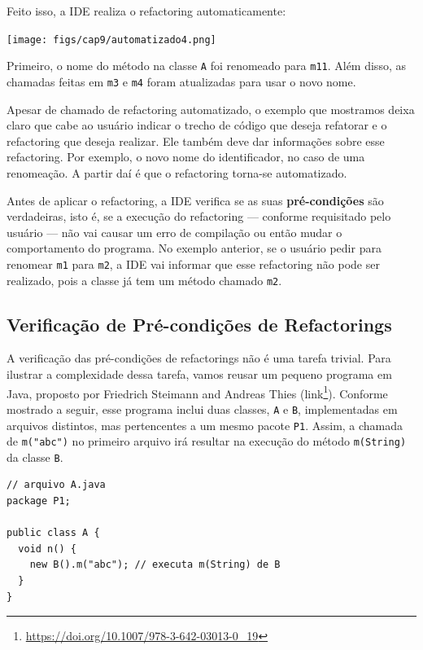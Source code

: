 \documentclass[
  11pt,
  twoside]{book}
\newcommand{\passthrough}[1]{#1}
\DeclareRobustCommand{\href}[2]{#2\footnote{\url{#1}}}
\begin{document}
Feito isso, a IDE realiza o refactoring automaticamente:

\texttt{[image: figs/cap9/automatizado4.png]}

Primeiro, o nome do método na classe \passthrough{\lstinline!A!} foi
renomeado para \passthrough{\lstinline!m11!}. Além disso, as chamadas
feitas em \passthrough{\lstinline!m3!} e \passthrough{\lstinline!m4!}
foram atualizadas para usar o novo nome.

Apesar de chamado de refactoring automatizado, o exemplo que mostramos
deixa claro que cabe ao usuário indicar o trecho de código que deseja
refatorar e o refactoring que deseja realizar. Ele também deve dar
informações sobre esse refactoring. Por exemplo, o novo nome do
identificador, no caso de uma renomeação. A partir daí é que o
refactoring torna-se automatizado.

 Antes de aplicar o refactoring, a IDE
verifica se as suas \textbf{pré-condições} são verdadeiras, isto é, se a
execução do refactoring --- conforme requisitado pelo usuário --- não
vai causar um erro de compilação ou então mudar o comportamento do
programa. No exemplo anterior, se o usuário pedir para renomear
\passthrough{\lstinline!m1!} para \passthrough{\lstinline!m2!}, a IDE
vai informar que esse refactoring não pode ser realizado, pois a classe
já tem um método chamado \passthrough{\lstinline!m2!}.

\hypertarget{verificauxe7uxe3o-de-pruxe9-condiuxe7uxf5es-de-refactorings}{%
\subsection{Verificação de Pré-condições de
Refactorings}\label{verificauxe7uxe3o-de-pruxe9-condiuxe7uxf5es-de-refactorings}}

A verificação das pré-condições de refactorings não é uma tarefa
trivial. Para ilustrar a complexidade dessa tarefa, vamos reusar um
pequeno programa em Java, proposto por Friedrich Steimann and Andreas
Thies (\href{https://doi.org/10.1007/978-3-642-03013-0_19}{link}).
Conforme mostrado a seguir, esse programa inclui duas classes,
\passthrough{\lstinline!A!} e \passthrough{\lstinline!B!}, implementadas
em arquivos distintos, mas pertencentes a um mesmo pacote
\passthrough{\lstinline!P1!}. Assim, a chamada de
\passthrough{\lstinline!m("abc")!} no primeiro arquivo irá resultar na
execução do método \passthrough{\lstinline!m(String)!} da classe
\passthrough{\lstinline!B!}.

\begin{lstlisting}
// arquivo A.java
package P1;

public class A {
  void n() { 
    new B().m("abc"); // executa m(String) de B
  }
}
\end{lstlisting}
\end{document}
